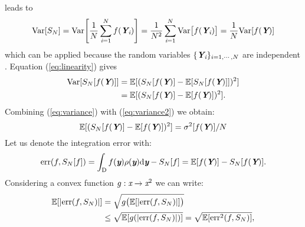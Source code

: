 leads to
\begin{equation}\label{eq:variance}
\textrm{Var}[S_{N}]= \textrm{Var}\Bigg[\frac{1}{N}\sum_{\textit{i}=1}^{N}f(\textit{\textbf{Y}}_{\textit{i}})\Bigg] =
 \frac{1}{N^2}\sum_{\textit{i}=1}^{N}\textrm{Var}\big[f(\textit{\textbf{Y}}_{\textit{i}})\big] = \frac{1}{N}\textrm{Var}[f(\textit{\textbf{Y}})]
\end{equation}
which can be applied because the random variables $\{\textit{\textbf{Y}}_{\textit{i}}\}_{i = 1, \cdots, N}$ are independent \cite{grinstead2012introduction}. 
Equation (\ref{eq:linearity}) gives
\begin{equation}\label{eq:variance2}
\begin{aligned}
\textrm{Var}[S_N[f(\textit{\textbf{Y}})]] &= \mathbb{E}[(S_{N}[f(\textit{\textbf{Y}})]-\mathbb{E}[S_{N}[f(\textit{\textbf{Y}})]])^2]\\ &= \mathbb{E}[(S_{N}[f(\textit{\textbf{Y}})]-\mathbb{E}[f(\textit{\textbf{Y}})])^2].
\end{aligned}
\end{equation}
Combining (\ref{eq:variance}) with (\ref{eq:variance2}) we obtain:
\begin{equation}\label{eq:variance3}
\mathbb{E}[(S_{N}[f(\textit{\textbf{Y}})]-\mathbb{E}[f(\textit{\textbf{Y}})])^2] = \sigma^2[f(\textit{\textbf{Y}})]/N
\end{equation}
Let us denote the integration error with:
\begin{equation}\label{eq:error1}
\textrm{err}(f, S_{N}[f]) =\int_{\textup{D}}f(\textit{\textbf{y}})\rho(\textit{\textbf{y}}) \textrm{d}\textit{\textbf{y}}-S_{N}[f] = \mathbb{E}[f(\textit{\textbf{Y}})]-S_N[f(\textit{\textbf{Y}})].
\end{equation}
Considering a convex function $g:\textit{x}\rightarrow\textit{x}^2$ we can write:
\begin{equation}
\begin{aligned}
\mathbb{E}[|\textrm{err}(f, S_{N})|] &= \sqrt{g\big(\mathbb{E}[|\textrm{err}(f, S_{N})|]\big)} \\&\leq\sqrt{\mathbb{E}[g(|\textrm{err}(f, S_{N})|)]} = \sqrt{\mathbb{E}[\textrm{err}^2(f, S_{N})]},
\end{aligned}
\end{equation} 
